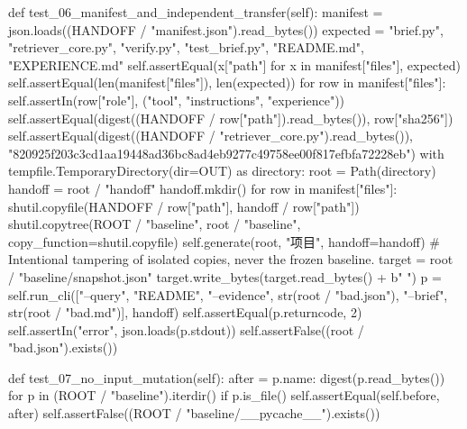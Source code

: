     def test_06_manifest_and_independent_transfer(self):
        manifest = json.loads((HANDOFF / "manifest.json").read_bytes())
        expected = {"brief.py", "retriever_core.py", "verify.py", "test_brief.py", "README.md", "EXPERIENCE.md"}
        self.assertEqual({x["path"] for x in manifest["files"]}, expected)
        self.assertEqual(len(manifest["files"]), len(expected))
        for row in manifest["files"]:
            self.assertIn(row["role"], ("tool", "instructions", "experience"))
            self.assertEqual(digest((HANDOFF / row["path"]).read_bytes()), row["sha256"])
        self.assertEqual(digest((HANDOFF / "retriever_core.py").read_bytes()),
                         "820925f203c3cd1aa19448ad36bc8ad4eb9277c49758ee00f817efbfa72228eb")
        with tempfile.TemporaryDirectory(dir=OUT) as directory:
            root = Path(directory)
            handoff = root / "handoff"
            handoff.mkdir()
            for row in manifest["files"]:
                shutil.copyfile(HANDOFF / row["path"], handoff / row["path"])
            shutil.copytree(ROOT / "baseline", root / "baseline", copy_function=shutil.copyfile)
            self.generate(root, "项目", handoff=handoff)
            # Intentional tampering of isolated copies, never the frozen baseline.
            target = root / "baseline/snapshot.json"
            target.write_bytes(target.read_bytes() + b" ")
            p = self.run_cli(["--query", "README", "--evidence", str(root / "bad.json"),
                              "--brief", str(root / "bad.md")], handoff)
            self.assertEqual(p.returncode, 2)
            self.assertIn("error", json.loads(p.stdout))
            self.assertFalse((root / "bad.json").exists())

    def test_07_no_input_mutation(self):
        after = {p.name: digest(p.read_bytes()) for p in (ROOT / "baseline").iterdir() if p.is_file()}
        self.assertEqual(self.before, after)
        self.assertFalse((ROOT / "baseline/__pycache__").exists())


